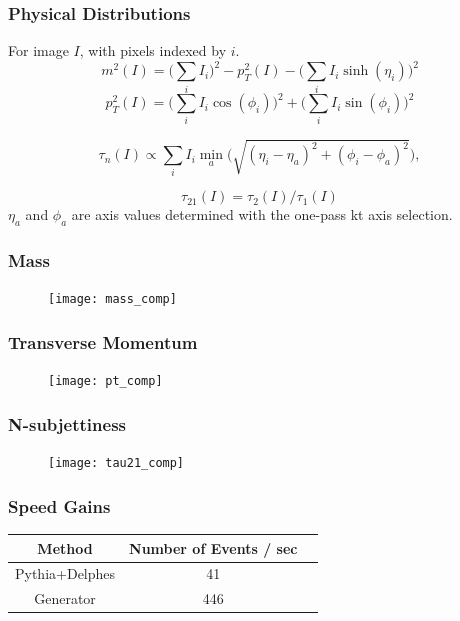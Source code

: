 \documentclass{beamer}
\begin{document}
	\begin{frame}
		\frametitle{Physical Distributions}
		For image $I$, with pixels indexed by $i$.
		$$
		m^2(I) = \bigg(\sum_i I_i\bigg)^2 -p^2_T(I) - \bigg(\sum_i I_i \sinh(\eta_i)\bigg)^2
		$$
		$$
		p_T^2(I) = \bigg(\sum_i I_i \cos(\phi_i)\bigg)^2 + \bigg(\sum_i I_i \sin(\phi_i)\bigg)^2
		$$
		
		
		$$
		\tau_n (I) \propto \sum_i I_i \min_a \bigg(\sqrt{(\eta_i - \eta_a)^2 + (\phi_i - \phi_a)^2}\bigg),
		$$
		
		$$
		\tau_{21} (I) = \tau_2 (I) / \tau_1 (I)
		$$
		$\eta_a$ and $\phi_a$ are axis values determined with the one-pass kt axis selection.
		
	\end{frame}
	
	\begin{frame}
		\frametitle{Mass}
		\begin{figure}[H]
			\centering
			\texttt{[image: mass\_comp]}
			
		\end{figure}
	\end{frame}

	\begin{frame}
		\frametitle{Transverse Momentum}
		\begin{figure}[H]
			\centering
			\texttt{[image: pt\_comp]}
			
		\end{figure}
	\end{frame}

	\begin{frame}
		\frametitle{N-subjettiness}
		\begin{figure}[H]
			\centering
			\texttt{[image: tau21\_comp]}
			
		\end{figure}
	\end{frame}

	\begin{frame}
		\centering
		\frametitle{Speed Gains}
			\begin{tabular}{ccc}
			\toprule Method  & Number of Events / sec \\
			\midrule Pythia+Delphes  & 41\\
			\midrule Generator  & 446\\

			\bottomrule
		\end{tabular}
	\end{frame}

	
	
	

	
	
	
\end{document}

